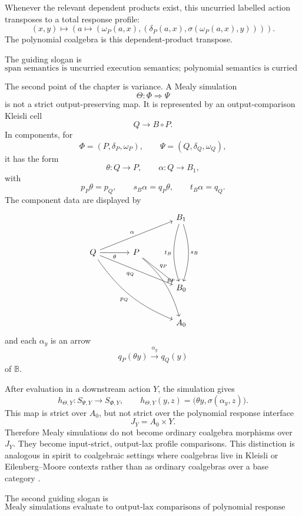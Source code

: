 Whenever the relevant dependent products exist, this uncurried labelled action
transposes to a total response profile:
\[
(x,y)
\longmapsto
\left(
a
\longmapsto
\left(
\omega_P(a,x),
\left(
\delta_P(a,x),
\sigma(\omega_P(a,x),y)
\right)
\right)
\right).
\]
The polynomial coalgebra is this dependent-product transpose.

The guiding slogan is
\[
\boxed{
\text{span semantics is uncurried execution semantics; polynomial semantics is
curried total-response semantics.}
}
\]

The second point of the chapter is variance.  A Mealy simulation
\[
\Theta:\Phi\Rightarrow\Psi
\]
is not a strict output-preserving map.  It is represented by an
output-comparison Kleisli cell
\[
Q\to B\circ P.
\]
In components, for
\[
\Phi=(P,\delta_P,\omega_P),
\qquad
\Psi=(Q,\delta_Q,\omega_Q),
\]
it has the form
\[
\theta:Q\to P,
\qquad
\alpha:Q\to B_1,
\]
with
\[
p_P\theta=p_Q,
\qquad
s_B\alpha=q_P\theta,
\qquad
t_B\alpha=q_Q.
\]
The component data are displayed by
\[
\begin{tikzcd}[column sep=large,row sep=large]
&&
B_1
  \arrow[dd,bend left=18,"s_B"]
  \arrow[dd,bend right=18,"t_B"']
&
\\
Q
  \arrow[rru,"\alpha"]
  \arrow[r,"\theta"']
  \arrow[drr,"q_Q"']
  \arrow[ddrr,bend right=16,"p_Q"']
&
P
  \arrow[dr,"q_P"]
  \arrow[rdd,bend left=16,"p_P"]
&&
\\
&&
B_0
&
\\
&&
A_0
&
\end{tikzcd}
\]
and each \(\alpha_y\) is an arrow
\[
q_P(\theta y)\xrightarrow{\alpha_y}q_Q(y)
\]
of \(\mathbb B\).

After evaluation in a downstream action \(Y\), the simulation gives
\[
h_{\Theta,Y}:S_{\Psi,Y}\to S_{\Phi,Y},
\qquad
h_{\Theta,Y}(y,z)
=
\bigl(\theta y,\sigma(\alpha_y,z)\bigr).
\]
This map is strict over \(A_0\), but not strict over the polynomial response
interface
\[
J_Y=A_0\times Y.
\]
Therefore Mealy simulations do not become ordinary coalgebra morphisms over
\(J_Y\).  They become input-strict, output-lax profile comparisons.  This
distinction is analogous in spirit to coalgebraic settings where coalgebras
live in Kleisli or Eilenberg--Moore contexts rather than as ordinary
coalgebras over a base category
\cite{BeoharKonigKupperMikaMichalski2022LiftingsSideEffects}.

The second guiding slogan is
\[
\boxed{
\text{Mealy simulations evaluate to output-lax comparisons of polynomial
response profiles.}
}
\]

